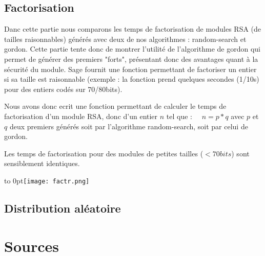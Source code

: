 \documentclass[a4paper,11pt]{article}
\begin{document}
\subsection{Factorisation }
Danc cette partie nous comparons les temps de factorisation de modules RSA (de tailles raisonnables) générés avec deux de nos algorithmes : random-search et gordon. Cette partie tente donc de montrer l'utilité de l'algorithme de gordon qui permet de générer des premiers "forts", présentant donc des avantages quant à la sécurité du module.
Sage fournit une fonction permettant de factoriser un entier si sa taille est raisonnable (exemple : la fonction prend quelques secondes (1/10s) pour des entiers codés sur 70/80bits). 
\par Nous avons donc ecrit une fonction permettant de calculer le temps de factorisation d'un module RSA, donc d'un entier $n$ tel que : \
\ $n = p * q$ 
\newline avec $p$ et $q$ deux premiers générés soit par l'algorithme random-search, soit par celui de gordon.

Les temps de factorisation pour des modules de petites tailles ($ < 70 bits$) sont sensiblement identiques.

\hfill\hbox to 0pt{\hss\texttt{[image: factr.png]}\hss}\hfill\null




\subsection{Distribution aléatoire}
\section*{Sources}




 
  
\end{document}
